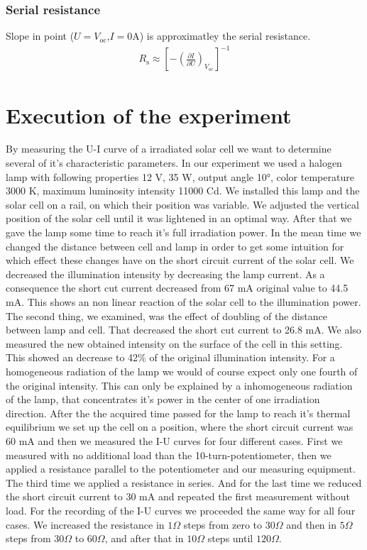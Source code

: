 \documentclass[a4paper, 12pt]{scrartcl}
\begin{document}
\subsubsection{Serial resistance}
Slope in point ($U=V_\textrm{oc}$,$I=0$A) is approximatley the serial resistance. 
\begin{align}
R_\textrm{s} \approx \left[ - \left( \frac{\partial I}{\partial U} \right)_{V_\textrm{oc}} \right]^{-1}
\end{align}

\section{Execution of the experiment}
By measuring the U-I curve of a irradiated solar cell we want to determine several of it's characteristic parameters. In our experiment we used a halogen lamp with following properties 12 V, 35 W, output angle 10°, color temperature 3000 K, maximum luminosity intensity 11000 Cd. We installed this lamp and the solar cell on a rail, on which their position was variable. We adjusted the vertical position of the solar cell until it was lightened in an optimal way. After that we gave the lamp some time to reach it's full irradiation power. In the mean time we changed the distance between cell and lamp in order to get some intuition for which effect these changes have on the short circuit current of the solar cell. We decreased the illumination intensity by decreasing the lamp current. As a consequence the short cut current decreased from 67 mA original value to 44.5 mA. This shows an non linear reaction of the solar cell to the illumination power. The second thing, we examined, was the effect of doubling of the distance between lamp and cell. That decreased the short cut current to 26.8 mA. We also measured the new obtained intensity on the surface of the cell in this setting. This showed an decrease to 42\% of the original illumination intensity. For a homogeneous radiation of the lamp we would of course expect only one fourth of the original intensity. This can only be explained by a inhomogeneous radiation of the lamp, that concentrates it's power in the center of one irradiation direction.\newline\newline
After the the acquired time passed for the lamp to reach it's thermal equilibrium we set up the cell on a position, where the short circuit current was 60 mA and then we measured the I-U curves for four different cases. \newline
First we measured with no additional load than the 10-turn-potentiometer, then we applied a resistance parallel to the potentiometer and our measuring equipment. The third time we applied a resistance in series. And for the last time we reduced the short circuit current to 30 mA and repeated the first measurement without load.\newline\newline
For the recording of the I-U curves we proceeded the same way for all four cases. We increased the resistance in $1\Omega$ steps from zero to $30\Omega$ and then in $5\Omega$ steps from $30\Omega$ to $60\Omega$, and after that in $10\Omega$ steps until $120\Omega$.
\end{document}
